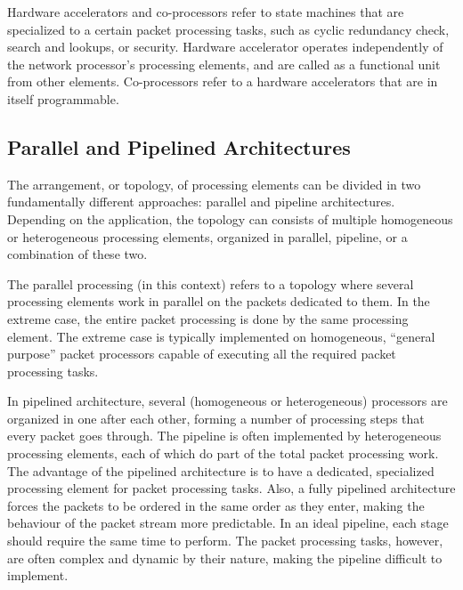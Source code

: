 Hardware accelerators and co-processors refer to state machines that are specialized to a certain packet processing tasks, such as cyclic redundancy check, search and lookups, or security. Hardware accelerator operates independently of the network processor's processing elements, and are called as a functional unit from other elements. Co-processors refer to a hardware accelerators that are in itself programmable.


\subsection{Parallel and Pipelined Architectures}

The arrangement, or topology, of processing elements can be divided in two fundamentally different approaches: parallel and pipeline architectures. Depending on the application, the topology can consists of multiple homogeneous or heterogeneous processing elements, organized in parallel, pipeline, or a combination of these two.~\cite{Giladi:2008:Network}

The parallel processing (in this context) refers to a topology where several processing elements work in parallel on the packets dedicated to them. In the extreme case, the entire packet processing is done by the same processing element. The extreme case is typically implemented on homogeneous, ``general purpose'' packet processors capable of executing all the required packet processing tasks.~\cite{Giladi:2008:Network}

In pipelined architecture, several (homogeneous or heterogeneous) processors are organized in one after each other, forming a number of processing steps that every packet goes through. The pipeline is often implemented by heterogeneous processing elements, each of which do part of the total packet processing work. The advantage of the pipelined architecture is to have a dedicated, specialized processing element for packet processing tasks. Also, a fully pipelined architecture forces the packets to be ordered in the same order as they enter, making the behaviour of the  packet stream more predictable. In an ideal pipeline, each stage should require the same time to perform. The packet processing tasks, however, are often complex and dynamic by their nature, making the pipeline difficult to implement.~\cite{Giladi:2008:Network}


